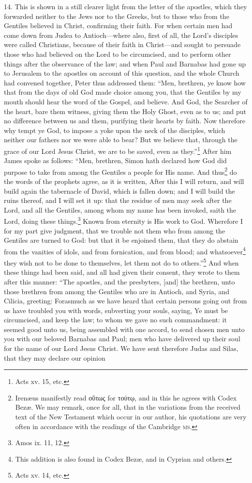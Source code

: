 14. This is shown in a still clearer light from the letter of the apostles, which they forwarded neither to the Jews nor to the Greeks, but to those who from the Gentiles believed in Christ, confirming their faith. For when certain men had come down from Judea to Antioch—where also, first of all, the Lord’s disciples were called Christians, because of their faith in Christ—and sought to persuade those who had believed on the Lord to be circumcised, and to perform other things after the observance of the law; and when Paul and Barnabas had gone up to Jerusalem to the apostles on account of this question, and the whole Church had convened together, Peter thus addressed them: “Men, brethren, ye know how that from the days of old God made choice among you, that the Gentiles by my mouth should hear the word of the Gospel, and believe. And God, the Searcher of the heart, bare them witness, giving them the Holy Ghost, even as to us; and put no difference between us and them, purifying their hearts by faith. Now therefore why tempt ye God, to impose a yoke upon the neck of the disciples, which neither our fathers nor we were able to bear? But we believe that, through the grace of our Lord Jesus Christ, we are to be saved, even as they.”\footnote{Acts xv. 15, etc.} After him James spoke as follows: “Men, brethren, Simon hath declared how God did purpose to take from among the Gentiles a people for His name. And thus\footnote{Irenæus manifestly read \textgreek{οὕτως} for \textgreek{τούτῳ}, and in this he agrees with Codex Bezæ. We may remark, once for all, that in the variations from the received text of the New Testament which occur in our author, his quotations are very often in accordance with the readings of the Cambridge \textsc{ms.}} do the words of the prophets agree, as it is written, After this I will return, and will build again the tabernacle of David, which is fallen down; and I will build the ruins thereof, and I will set it up: that the residue of men may seek after the Lord, and all the Gentiles, among whom my name has been invoked, saith the Lord, doing these things.\footnote{Amos ix. 11, 12.} Known from eternity is His work to God. Wherefore I for my part give judgment, that we trouble not them who from among the Gentiles are turned to God: but that it be enjoined them, that they  do abstain from the vanities of idols, and from fornication, and from blood; and whatsoever\footnote{This addition is also found in Codex Bezæ, and in Cyprian and others.} they wish not to be done to themselves, let them not do to others.”\footnote{Acts xv. 14, etc.} And when these things had been said, and all had given their consent, they wrote to them after this manner: “The apostles, and the presbyters, [and] the brethren, unto those brethren from among the Gentiles who are in Antioch, and Syria, and Cilicia, greeting: Forasmuch as we have heard that certain persons going out from us have troubled you with words, subverting your souls, saying, Ye must be circumcised, and keep the law; to whom we gave no such commandment: it seemed good unto us, being assembled with one accord, to send chosen men unto you with our beloved Barnabas and Paul; men who have delivered up their soul for the name of our Lord Jesus Christ. We have sent therefore Judas and Silas, that they may declare our opinion 